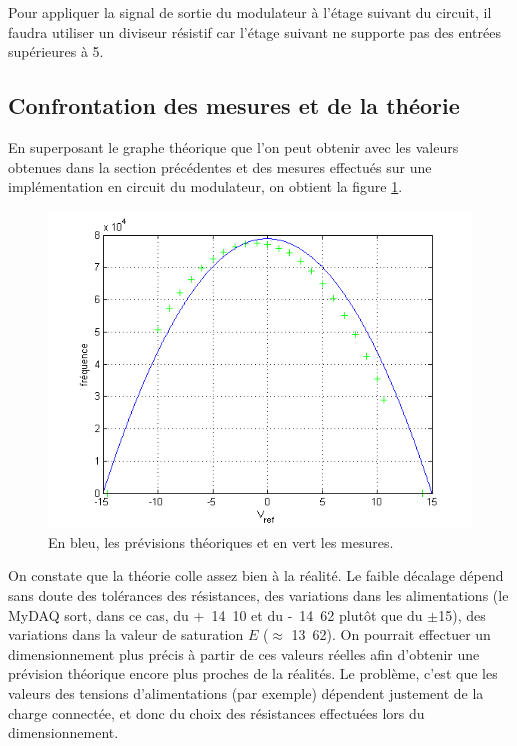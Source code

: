 
Pour appliquer la signal de sortie du modulateur
à l'étage suivant du circuit, il faudra utiliser un diviseur
résistif car l'étage suivant ne supporte pas des entrées supérieures
à \unit{5}{\volt}.

\subsection{Confrontation des mesures et de la théorie}
En superposant le graphe théorique que l'on peut obtenir avec les valeurs
obtenues dans la section précédentes
et des mesures effectués sur une implémentation en circuit
du modulateur, on obtient la figure \ref{fig:sigma-delta-f-vs-vref-dim-vs-real}.

\begin{figure}[ht]
	\centering
	\includegraphics[scale=0.7]{img/sigma-delta-f-vs-vref-dim-vs-real.png}
	\caption{En bleu, les prévisions théoriques et en vert les mesures.}
	\label{fig:sigma-delta-f-vs-vref-dim-vs-real}
\end{figure}

On constate que la théorie colle assez bien à la réalité. Le
faible décalage dépend sans doute des tolérances des résistances,
des variations dans les alimentations (le MyDAQ sort, dans ce cas, du
\unit{+14.10}{\volt} et du \unit{-14.62}{\volt} plutôt que du
$\pm$\unit{15}{\volt}), des variations dans la valeur de saturation
$E$ ($\approx$ \unit{13.62}{\volt}). On pourrait effectuer un
dimensionnement plus précis à partir de ces valeurs réelles afin
d'obtenir une prévision théorique encore plus proches de la réalités.
Le problème, c'est que les valeurs des tensions
d'alimentations (par exemple) dépendent justement de la charge 
connectée, et donc du choix des résistances effectuées lors du dimensionnement.

